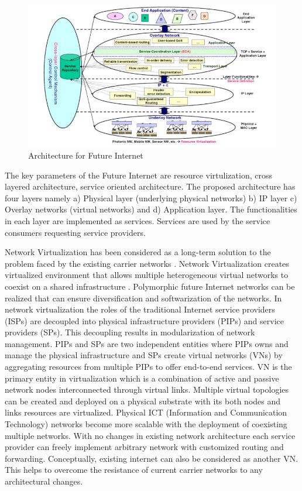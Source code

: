 \documentclass[article,dr=phil,type=msc ,colorback,accentcolor=tud4b]{tudthesis}
\begin{document}
  \begin{figure}[h]
 	\centering
 	\includegraphics[width=16cm]{fcn_arc.jpg}
 	\caption{Architecture for Future Internet}
 	\label{fig: Future Network Architecture}
 \end{figure}
 The key parameters of the Future Internet are resource virtulization, cross layered architecture, service oriented architecture. The proposed architecture has four layers namely a) Physical layer (underlying physical networks) b) IP layer c) Overlay networks (virtual networks) and d) Application layer. The functionalities in each layer are implemented as services. Services are used by the service consumers requesting service providers. \newline
  
 \hspace*{0.5cm}
Network Virtualization has been considered as a long-term solution to the problem faced by the existing carrier networks \cite{1432642}. Network Virtualization creates virtualized environment that allows multiple heterogeneous virtual networks to coexist on a shared infrastructure \cite{nw_virt}. Polymorphic future Internet networks can be realized that can ensure diversification and softwarization of the networks. In network virtualization the roles of the traditional Internet service providers (ISPs) are decoupled into physical infrastructure providers (PIPs) and service providers (SPs). This decoupling results in modularization of network management. PIPs and SPs are two independent entities where PIPs owns and manage the physical infrastructure and SPs create virtual networks (VNs) by aggregating resources from multiple PIPs to offer end-to-end services. VN is the primary entity in virtualization which is a combination of active and passive network nodes interconnected through virtual links. Multiple virtual topologies can be created and deployed on a physical substrate with its both nodes and links resources are virtualized. Physical ICT (Information and Communication Technology) networks become more scalable with the deployment of coexisting multiple networks. With no changes in existing network architecture each service provider can freely implement arbitrary network with customized routing and forwarding. Conceptually, existing internet can also be considered as another VN. This helps to overcome the resistance of current carrier networks to any architectural changes.\newline
 
\end{document}
